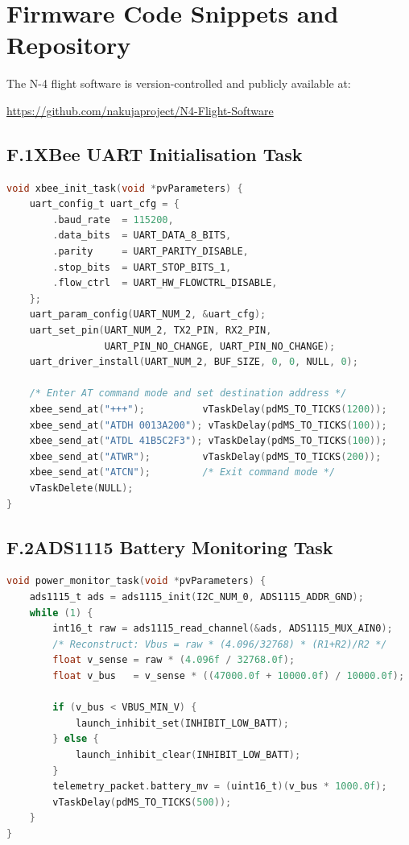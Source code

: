 \section{Firmware Code Snippets and Repository}
\label{app:firmware}

The N-4 flight software is version-controlled and publicly available at:
\begin{center}
  \url{https://github.com/nakujaproject/N4-Flight-Software} \cite{n4_github}
\end{center}

\subsection*{F.1\quad XBee UART Initialisation Task}
\begin{lstlisting}[language=C, caption={XBee UART initialisation and AT-command configuration (excerpt from \texttt{xbee\_task.c}) \cite{n4_github}}]
void xbee_init_task(void *pvParameters) {
    uart_config_t uart_cfg = {
        .baud_rate  = 115200,
        .data_bits  = UART_DATA_8_BITS,
        .parity     = UART_PARITY_DISABLE,
        .stop_bits  = UART_STOP_BITS_1,
        .flow_ctrl  = UART_HW_FLOWCTRL_DISABLE,
    };
    uart_param_config(UART_NUM_2, &uart_cfg);
    uart_set_pin(UART_NUM_2, TX2_PIN, RX2_PIN,
                 UART_PIN_NO_CHANGE, UART_PIN_NO_CHANGE);
    uart_driver_install(UART_NUM_2, BUF_SIZE, 0, 0, NULL, 0);

    /* Enter AT command mode and set destination address */
    xbee_send_at("+++");          vTaskDelay(pdMS_TO_TICKS(1200));
    xbee_send_at("ATDH 0013A200"); vTaskDelay(pdMS_TO_TICKS(100));
    xbee_send_at("ATDL 41B5C2F3"); vTaskDelay(pdMS_TO_TICKS(100));
    xbee_send_at("ATWR");         vTaskDelay(pdMS_TO_TICKS(200));
    xbee_send_at("ATCN");         /* Exit command mode */
    vTaskDelete(NULL);
}
\end{lstlisting}

\subsection*{F.2\quad ADS1115 Battery Monitoring Task}
\begin{lstlisting}[language=C, caption={ADS1115 I\textsuperscript{2}C voltage monitoring and launch-inhibit logic (excerpt from \texttt{power\_monitor.c}) \cite{n4_github}}]
void power_monitor_task(void *pvParameters) {
    ads1115_t ads = ads1115_init(I2C_NUM_0, ADS1115_ADDR_GND);
    while (1) {
        int16_t raw = ads1115_read_channel(&ads, ADS1115_MUX_AIN0);
        /* Reconstruct: Vbus = raw * (4.096/32768) * (R1+R2)/R2 */
        float v_sense = raw * (4.096f / 32768.0f);
        float v_bus   = v_sense * ((47000.0f + 10000.0f) / 10000.0f);

        if (v_bus < VBUS_MIN_V) {
            launch_inhibit_set(INHIBIT_LOW_BATT);
        } else {
            launch_inhibit_clear(INHIBIT_LOW_BATT);
        }
        telemetry_packet.battery_mv = (uint16_t)(v_bus * 1000.0f);
        vTaskDelay(pdMS_TO_TICKS(500));
    }
}
\end{lstlisting}

